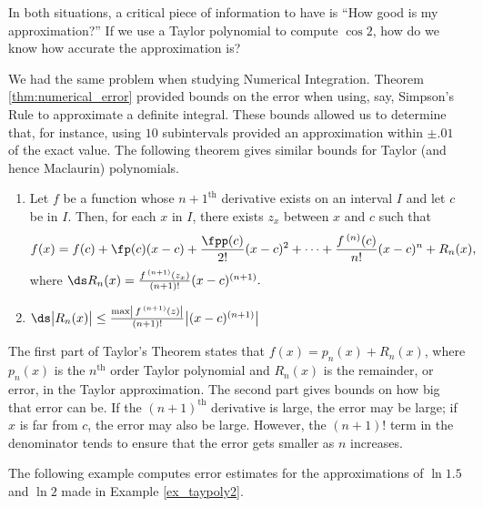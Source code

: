 	
In both situations, a critical piece of information to have is ``How good is my approximation?'' If we use a Taylor polynomial to compute $\cos 2$, how do we know how accurate the approximation is? 

We had the same problem when studying Numerical Integration. Theorem \ref{thm:numerical_error} provided bounds on the error when using, say, Simpson's Rule to approximate a definite integral. These bounds allowed us to determine that, for instance, using $10$ subintervals provided an approximation within $\pm .01$ of the exact value. The following theorem gives similar bounds for Taylor (and hence Maclaurin) polynomials.

\setboxwidth{65pt}
{\begin{enumerate}
\item	Let $f$ be a function whose $n+1^\text{th}$ derivative exists on an interval $I$ and let $c$ be in $I$. Then, for each $x$ in $I$, there exists $z_x$ between $x$ and $c$ such that
$$f(x) = f(c) + \fp(c)(x-c) + \frac{\fpp(c)}{2!}(x-c)^2+ \cdots +\frac{f\,^{(n)}(c)}{n!}(x-c)^n+R_n(x),$$
where $\ds R_n(x) = \frac{f\,^{(n+1)}(z_x)}{(n+1)!}(x-c)^{(n+1)}.$

\item		$\ds \big|R_n(x)\big| \leq \frac{\max\left|\,f\,^{(n+1)}(z)\right|}{(n+1)!}\big|(x-c)^{(n+1)}\big|$
\end{enumerate}}

The first part of Taylor's Theorem states that $f(x) = p_n(x) + R_n(x)$, where $p_n(x)$ is the $n^\text{th}$ order Taylor polynomial and $R_n(x)$ is the remainder, or error, in the Taylor approximation. The second part gives bounds on how big that error can be. If the $(n+1)^\text{th}$ derivative is large, the error may be large; if $x$ is far from $c$, the error may also be large. However, the $(n+1)!$ term in the denominator tends to ensure that the error gets smaller as $n$ increases.

The following example computes error estimates for the approximations of $\ln 1.5$ and $\ln 2$ made in Example \ref{ex_taypoly2}.\\

